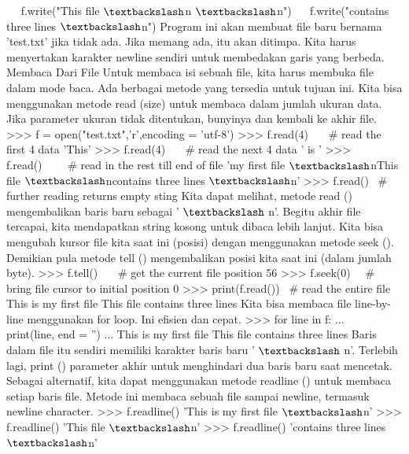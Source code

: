 ~~ f.write("This file $  \textbackslash  $n $  \textbackslash  $n") 
~~ f.write("contains three lines $  \textbackslash  $n") 
Program ini akan membuat file baru bernama 'test.txt' jika tidak ada. Jika memang ada, itu akan ditimpa.
Kita harus menyertakan karakter newline sendiri untuk membedakan garis yang berbeda. 
Membaca Dari File
Untuk membaca isi sebuah file, kita harus membuka file dalam mode baca. 
Ada berbagai metode yang tersedia untuk tujuan ini. Kita bisa menggunakan metode read (size) untuk membaca dalam jumlah ukuran data. Jika parameter ukuran tidak ditentukan, bunyinya dan kembali ke akhir file.
>>> f = open("test.txt",'r',encoding = 'utf-8')
>>> f.read(4)~~~  $  \#  $ read the first 4 data 
'This' 
>>> f.read(4)~~~  $  \#  $ read the next 4 data
' is ' 
>>> f.read()~~~~  $  \#  $ read in the rest till end of file 
'my first file $  \textbackslash  $nThis file $  \textbackslash  $ncontains three lines $  \textbackslash  $n' 
>>> f.read()~  $  \#  $ further reading returns empty sting 
Kita dapat melihat, metode read () mengembalikan baris baru sebagai ' $  \textbackslash  $ n'. Begitu akhir file tercapai, kita mendapatkan string kosong untuk dibaca lebih lanjut. 
Kita bisa mengubah kursor file kita saat ini (posisi) dengan menggunakan metode seek (). Demikian pula metode tell () mengembalikan posisi kita saat ini (dalam jumlah byte). 
>>> f.tell()~~~  $  \#  $ get the current file position 
56 
>>> f.seek(0)~~  $  \#  $ bring file cursor to initial position 
0 
>>> print(f.read())~  $  \#  $ read the entire file 
This is my first file 
This file
contains three lines 
Kita bisa membaca file line-by-line menggunakan for loop. Ini efisien dan cepat. 
>>> for line in f: 
...~~~~ print(line, end = '') 
...  
This is my first file 
This file 
contains three lines 
Baris dalam file itu sendiri memiliki karakter baris baru ' $  \textbackslash  $ n'.
Terlebih lagi, print () parameter akhir untuk menghindari dua baris baru saat mencetak. 
Sebagai alternatif, kita dapat menggunakan metode readline () untuk membaca setiap baris file. Metode ini membaca sebuah file sampai newline, termasuk newline character.
>>> f.readline() 
'This is my first file $  \textbackslash  $n' 
>>> f.readline()
'This file $  \textbackslash  $n' 
>>> f.readline() 
'contains three lines $  \textbackslash  $n' 

